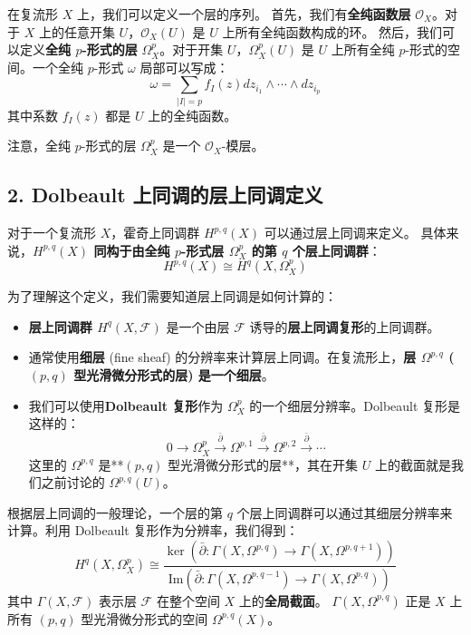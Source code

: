 \documentclass{amsart}
\theoremstyle{plain}
\theoremstyle{definition}
\theoremstyle{remark}
\begin{document}
在复流形 $X$ 上，我们可以定义一个层的序列。
首先，我们有\textbf{全纯函数层} $\mathcal{O}_X$。对于 $X$ 上的任意开集 $U$，$\mathcal{O}_X(U)$ 是 $U$ 上所有全纯函数构成的环。
然后，我们可以定义\textbf{全纯 $p$-形式的层} $\Omega^p_X$。对于开集 $U$，$\Omega^p_X(U)$ 是 $U$ 上所有全纯 $p$-形式的空间。一个全纯 $p$-形式 $\omega$ 局部可以写成：
\[
\omega = \sum_{|I|=p} f_I(z) dz_{i_1} \wedge \cdots \wedge dz_{i_p}
\]
其中系数 $f_I(z)$ 都是 $U$ 上的全纯函数。

注意，全纯 $p$-形式的层 $\Omega^p_X$ 是一个 $\mathcal{O}_X$-模层。

\subsection{2. Dolbeault 上同调的层上同调定义}

对于一个复流形 $X$，霍奇上同调群 $H^{p,q}(X)$ 可以通过层上同调来定义。
具体来说，\textbf{$H^{p,q}(X)$ 同构于由全纯 $p$-形式层 $\Omega^p_X$ 的第 $q$ 个层上同调群}：
\[
H^{p,q}(X) \cong H^q(X, \Omega^p_X)
\]

为了理解这个定义，我们需要知道层上同调是如何计算的：

\begin{itemize}
	\item \textbf{层上同调群 $H^q(X, \mathcal{F})$} 是一个由层 $\mathcal{F}$ 诱导的\textbf{层上同调复形}的上同调群。
	\item 通常使用\textbf{细层} (fine sheaf) 的分辨率来计算层上同调。在复流形上，\textbf{层 $\Omega^{p,q}$ ($(p,q)$ 型光滑微分形式的层) 是一个细层}。
	\item 我们可以使用\textbf{Dolbeault 复形}作为 $\Omega^p_X$ 的一个细层分辨率。Dolbeault 复形是这样的：
\[
0 \to \Omega^p_X \xrightarrow{\bar{\partial}} \Omega^{p,1} \xrightarrow{\bar{\partial}} \Omega^{p,2} \xrightarrow{\bar{\partial}} \cdots
\]
这里的 $\Omega^{p,q}$ 是**$(p,q)$ 型光滑微分形式的层**，其在开集 $U$ 上的截面就是我们之前讨论的 $\Omega^{p,q}(U)$。
\end{itemize}

根据层上同调的一般理论，一个层的第 $q$ 个层上同调群可以通过其细层分辨率来计算。利用 Dolbeault 复形作为分辨率，我们得到：
\[
H^q(X, \Omega^p_X) \cong \frac{\ker(\bar{\partial}: \Gamma(X, \Omega^{p,q}) \to \Gamma(X, \Omega^{p,q+1}))}{\mathrm{Im}(\bar{\partial}: \Gamma(X, \Omega^{p,q-1}) \to \Gamma(X, \Omega^{p,q}))}
\]
其中 $\Gamma(X, \mathcal{F})$ 表示层 $\mathcal{F}$ 在整个空间 $X$ 上的\textbf{全局截面}。
$\Gamma(X, \Omega^{p,q})$ 正是 $X$ 上所有 $(p,q)$ 型光滑微分形式的空间 $\Omega^{p,q}(X)$。
\end{document}
